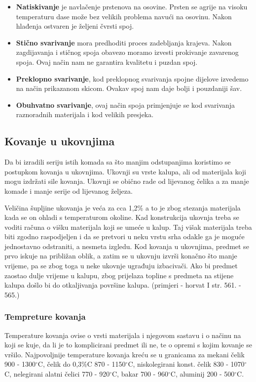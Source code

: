 \documentclass[a4paper,12pt]{article}
\numberwithin{figure}{section}
\begin{document}
\begin{itemize}
\item \textbf{Natiskivanje} je navlačenje prstenova na osovine. Prsten se agrije na visoku temperaturu dase može bez velikih problema navući na osovinu. Nakon hlađenja ostvaren je željeni čvrsti spoj.
\item \textbf{Stično svarivanje} mora predhoditi proces zadebljanja krajeva. Nakon zagdijavanja  i stičnog spoja obavezo moramo izvesti prokivanje zavarenog spoja. Ovaj način nam ne garantira kvalitetu i puzdan spoj.
\item \textbf{Preklopno svarivanje}, kod preklopnog svarivanja spojne dijelove izvedemo na način prikazanom skicom. Ovakav spoj nam daje bolji i pouzdaniji šav.
\item \textbf{Obuhvatno svarivanje}, ovaj način spoja primjenjuje se kod svarivanja raznoradnih materijala i kod velikih presjeka.
\end{itemize}
\subsection{Kovanje u ukovnjima}
Da bi izradili seriju istih komada sa što manjim odstupanjima koristimo se postupkom kovanja u ukovnjima. Ukovnji su vrste kalupa, ali od materijala koji mogu izdržati sile kovanja. Ukovnji se obično rade od lijevanog čelika a za manje komade i manje serije od lijevanog željeza.\par
Veličina šupljine ukovanja je veća za cca 1,2\% a to je zbog stezanja materijala kada se on ohladi s temperaturom okoline. Kad konstrukcija ukovnja treba se voditi računa o višku materijala koji se umeće u kalup. Taj višak materijala treba biti zgodno raspodjeljen i da se pretvori u neku vrstu srha odakle ga je moguće jednostavno odstraniti, a nesmeta izgledu.
Kod kovanja u ukovnjima, predmet se prvo iskuje na približan oblik, a zatim se u ukovnju izvrši konačno što manje vrijeme, pa se zbog toga u neke ukovnje ugrađuju izbacivači. Ako bi predmet zaostao dulje vrijeme u kalupu, zbog prijelaza topline s predmeta na stijene kalupa došlo bi do otkaljivanja površine kalupa. (primjeri - horvat I str. 561. - 565.)
\subsubsection{Tempreture kovanja}
Temperature kovanja ovise o vrsti materijala i njegovom sastavu i o načinu na koji se kuje, da li je to komplicirani predmet ili ne, te o opremi s kojim kovanje se vršilo. Najpovoljnije temperature kovanja kreću se u granicama za mekani čelik 900 - 1300$^{\circ}$C, čelik do 0,3$\%$C 870 - 1150$^{\circ}$C, niskolegirani konst. čelik 830 - 1070$^{\circ}$C, nelegirani alatni čelici 770 - 920$^{\circ}$C, bakar 700 - 960$^{\circ}$C, aluminij 200 - 500$^{\circ}$C.
\end{document}
